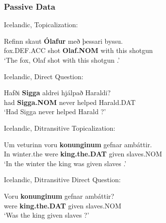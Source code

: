 \subsubsection{Passive Data}
\begin{exe}
	 Icelandic, Topicalization:
\begin{xlist}
	\ex \gll Refinn skaut \textbf{Ólafur} með  þessari byssu.\\
	fox.DEF.ACC shot \textbf{Olaf.NOM} with this shotgun\\
\trans `The fox, Olaf shot with this shotgun \citep[ex. 19a]{Zaenen.1985}.'
\end{xlist}
\pagebreak
{} Icelandic, Direct Question:
\begin{xlist}
	\ex \gll Hafði \textbf{Sigga} aldrei hjálpað Haraldi?\\
	had \textbf{Sigga.NOM} never helped Harald.DAT\\
\trans `Had Sigga never helped Harald \citep[ex. 20b]{Zaenen.1985}?'
\end{xlist}
	 Icelandic, Ditransitive Topicalization:
\begin{xlist}
	\ex \gll Um veturinn voru \textbf{konunginum} gefnar amb\'{a}ttir.\\
In winter.the were \textbf{king.the.DAT} given slaves.NOM\\
\trans `In the winter the king was given slaves \citep[ex. 47a]{Zaenen.1985}.'
\end{xlist}
 Icelandic, Ditransitive Direct Question:
\begin{xlist}
	\ex \gll Voru \textbf{konunginum} gefnar amb\'{a}ttir?\\
were \textbf{king.the.DAT} given slaves.NOM\\
\trans `Was the king given slaves \citep[ex. 48a]{Zaenen.1985}?'
\end{xlist}



\end{exe}

